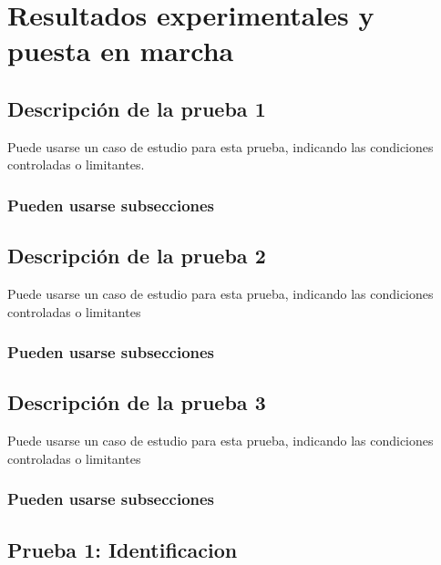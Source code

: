 \chapter{Resultados experimentales y puesta en marcha}%


\section{Descripción de la prueba 1}
Puede usarse un caso de estudio para esta prueba, indicando las condiciones controladas o limitantes.
\subsection{Pueden usarse subsecciones}

\section{Descripción de la prueba 2}
Puede usarse un caso de estudio para esta prueba, indicando las condiciones controladas o limitantes
\subsection{Pueden usarse subsecciones}

\section{Descripción de la prueba 3}
Puede usarse un caso de estudio para esta prueba, indicando las condiciones controladas o limitantes
\subsection{Pueden usarse subsecciones}





\section{Prueba 1: Identificacion}



